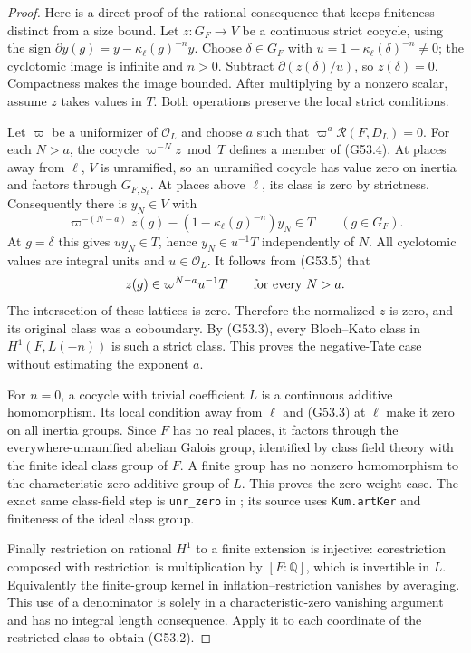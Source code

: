 \begin{proof}
Here is a direct proof of the rational consequence that
keeps finiteness distinct from a size bound.
Let $z:G_F\to V$ be a continuous strict cocycle, using
the sign $\partial y(g)=y-\kappa_\ell(g)^{-n}y$.
Choose $\delta\in G_F$ with
$u=1-\kappa_\ell(\delta)^{-n}\ne0$; the cyclotomic image
is infinite and $n>0$.
Subtract $\partial(z(\delta)/u)$, so $z(\delta)=0$.
Compactness makes the image bounded.  After multiplying
by a nonzero scalar, assume $z$ takes values in $T$.
Both operations preserve the local strict conditions.

Let $\varpi$ be a uniformizer of $\mathcal O_L$ and choose
$a$ such that $\varpi^a\mathcal R(F,D_L)=0$.
For each $N>a$, the cocycle $\varpi^{-N}z\bmod T$
defines a member of (G53.4).  At places away from $\ell$,
$V$ is unramified, so an unramified cocycle has value zero
on inertia and factors through $G_{F,S_\ell}$.
At places above $\ell$, its class is zero by strictness.
Consequently there is $y_N\in V$ with
\[
 \varpi^{-(N-a)}z(g)
       -(1-\kappa_\ell(g)^{-n})y_N\in T
                    \qquad(g\in G_F).
                                                               \tag{G53.5}
\]
At $g=\delta$ this gives $u y_N\in T$, hence
$y_N\in u^{-1}T$ independently of $N$.
All cyclotomic values are integral units and $u\in\mathcal O_L$.
It follows from (G53.5) that
\[
                  z(g)\in\varpi^{N-a}u^{-1}T
                      \qquad\hbox{for every }N>a.
\]
The intersection of these lattices is zero.  Therefore
the normalized $z$ is zero, and its original class was
a coboundary.  By (G53.3), every Bloch--Kato class in
$H^1(F,L(-n))$ is such a strict class.  This proves the
negative-Tate case without estimating the exponent $a$.

For $n=0$, a cocycle with trivial coefficient $L$ is
a continuous additive homomorphism.  Its local condition
away from $\ell$ and (G53.3) at $\ell$ make it zero on
all inertia groups.  Since $F$ has no real places, it
factors through the everywhere-unramified abelian
Galois group, identified by class field theory with
the finite ideal class group of $F$.  A finite group
has no nonzero homomorphism to the characteristic-zero
additive group of $L$.  This proves the zero-weight
case.  The exact same class-field step is
\texttt{unr\_zero} in
;
its source uses \texttt{Kum.artKer} and finiteness of the
ideal class group.

Finally restriction on rational $H^1$ to a finite
extension is injective: corestriction composed with
restriction is multiplication by $[F:\mathbb Q]$, which
is invertible in $L$.  Equivalently the finite-group
kernel in inflation--restriction vanishes by averaging.
This use of a denominator is solely in a
characteristic-zero vanishing argument and has no
integral length consequence.  Apply it to each
coordinate of the restricted class to obtain (G53.2).
\end{proof}

